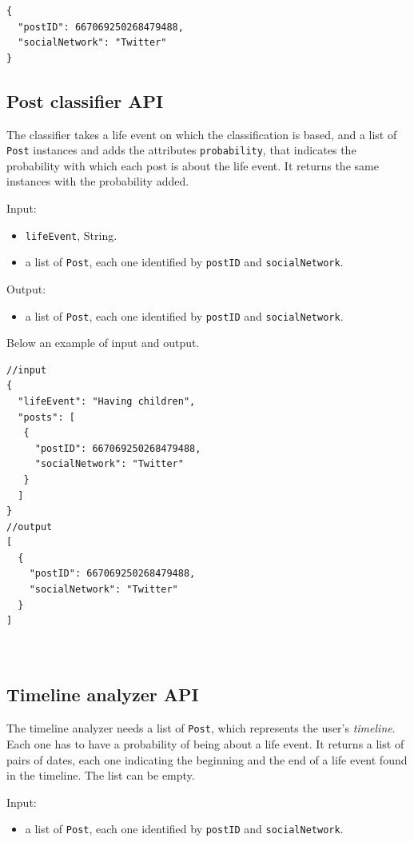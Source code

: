 \begin{Verbatim}
{
  "postID": 667069250268479488,
  "socialNetwork": "Twitter"
}
\end{Verbatim}

\subsection{Post classifier API}
The classifier takes a life event on which the classification is based, and a list of \texttt{Post} instances and adds the attributes \texttt{probability}, that indicates the probability with which each post is about the life event. It returns the same instances with the probability added.

Input:
\begin{itemize}
\item \texttt{lifeEvent}, String.
\item a list of \texttt{Post}, each one identified by \texttt{postID} and \texttt{socialNetwork}.
\end{itemize}

Output:
\begin{itemize}
\item a list of \texttt{Post}, each one identified by \texttt{postID} and \texttt{socialNetwork}.
\end{itemize}

Below an example of input and output.
\begin{multicols}{2}
\begin{Verbatim}
//input
{
  "lifeEvent": "Having children",
  "posts": [
   {
     "postID": 667069250268479488,
     "socialNetwork": "Twitter"
   }
  ]
}
//output
[
  {
    "postID": 667069250268479488,
    "socialNetwork": "Twitter"
  }
]



\end{Verbatim}
\end{multicols}

\subsection{Timeline analyzer API}
The timeline analyzer needs a list of \texttt{Post}, which represents the user's \emph{timeline}. Each one has to have a probability of being about a life event. It returns a list of pairs of dates, each one indicating the beginning and the end of a life event found in the timeline. The list can be empty.

Input:
\begin{itemize}
\item a list of \texttt{Post}, each one identified by \texttt{postID} and \texttt{socialNetwork}.
\end{itemize}

